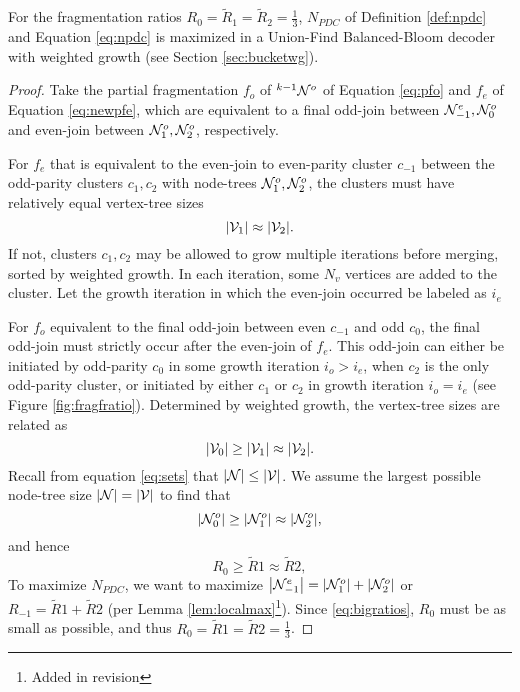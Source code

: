 \begin{theorem}\label{the:fragratio}
  For the fragmentation ratios $R_0 = \tilde{R}_1 = \tilde{R}_2 = \frac{1}{3}$, $N_{PDC}$ of Definition \ref{def:npdc} and Equation \eqref{eq:npdc} is maximized in a Union-Find Balanced-Bloom decoder with weighted growth (see Section \ref{sec:bucketwg}). 
\end{theorem}
\begin{proof}
  Take the partial fragmentation $f_o$ of ${}^{k-1}\mathcal{N}^o$ of Equation \eqref{eq:pfo} and $f_e$ of Equation \eqref{eq:newpfe}, which are equivalent to a final odd-join between $\mathcal{N}^e_{-1}, \mathcal{N}^o_0$ and even-join between $\mathcal{N}^o_1, \mathcal{N}^o_2$, respectively. 
  
  For $f_e$ that is equivalent to the even-join to even-parity cluster $c_{-1}$ between the odd-parity clusters $c_1, c_2$ with node-trees $\mathcal{N}^o_1, \mathcal{N}^o_2$, the clusters must have relatively equal vertex-tree sizes 
  \begin{equation*}
    \abs{\mathcal{V}_1} \approx \abs{\mathcal{V}_2}.
  \end{equation*}
  If not, clusters $c_1, c_2$ may be allowed to grow multiple iterations before merging, sorted by weighted growth. In each iteration, some $N_v$ vertices are added to the cluster. Let the growth iteration in which the even-join occurred be labeled as $i_e$
  
  For $f_o$ equivalent to the final odd-join between even $c_{-1}$ and odd $c_0$, the final odd-join must strictly occur after the even-join of $f_e$. This odd-join can either be initiated by odd-parity $c_0$ in some growth iteration $i_o > i_e$, when $c_2$ is the only odd-parity cluster, or initiated by either $c_1$ or $c_2$ in growth iteration $i_o = i_e$ (see Figure \ref{fig:fragfratio}). Determined by weighted growth, the vertex-tree sizes are related as
  \begin{equation*}
    \abs{\mathcal{V}_0} \geq \abs{\mathcal{V}_1} \approx \abs{\mathcal{V}_2}.
  \end{equation*}
  Recall from equation \eqref{eq:sets} that $|\mathcal{N}| \leq |\mathcal{V}|$. We assume the largest possible node-tree size $|\mathcal{N}| = |\mathcal{V}|$ to find that 
  \begin{equation*}
    \abs{\mathcal{N}^o_0} \geq \abs{\mathcal{N}^o_1} \approx \abs{\mathcal{N}^o_2},
  \end{equation*}
  and hence
  \begin{equation*}
    R_0 \geq \tilde{R}1 \approx \tilde{R}2,
  \end{equation*}
  To maximize $N_{PDC}$, we want to maximize $\abs{\mathcal{N}^e_{-1}} = \abs{\mathcal{N}^o_1} + \abs{\mathcal{N}^o_2}$ or $R_{-1}=\tilde{R}1 + \tilde{R}2$ (per Lemma \ref{lem:localmax}\footnote{Added in revision}). Since \eqref{eq:bigratios}, $R_0$ must be as small as possible, and thus $R_0 = \tilde{R}1 = \tilde{R}2 = \frac{1}{3}$. 
\end{proof}

